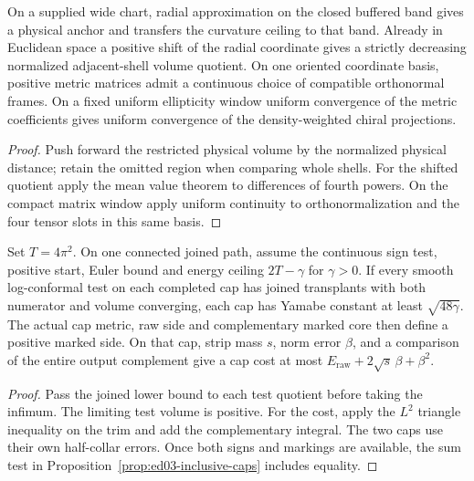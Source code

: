\begin{proposition}
\label{prop:ed03-chart-frame-tests}
\leanok
On a supplied wide chart, radial approximation on the closed buffered
band gives a physical anchor and transfers the curvature ceiling to
that band. Already in Euclidean space a positive shift of the radial
coordinate gives a strictly decreasing normalized adjacent-shell volume
quotient. On one oriented coordinate basis, positive metric matrices
admit a continuous choice of compatible orthonormal frames. On a fixed
uniform ellipticity window uniform convergence of the metric coefficients
gives uniform convergence of the density-weighted chiral projections.
\end{proposition}
\begin{proof}
\leanok
Push forward the restricted physical volume by the normalized physical
distance; retain the omitted region when comparing whole shells.
For the shifted quotient apply the mean value theorem to differences of
fourth powers. On the compact matrix window apply uniform continuity
to orthonormalization and the four tensor slots in this same basis.
\end{proof}

\begin{proposition}
\label{prop:ed03-cap-tests}
\leanok
Set $T=4\pi^2$. On one connected joined path, assume the continuous sign
test, positive start, Euler bound and energy ceiling $2T-\gamma$ for
$\gamma>0$. If every smooth log-conformal test on each completed cap
has joined transplants with both numerator and volume converging,
each cap has Yamabe constant at least $\sqrt{48\gamma}$. The actual
cap metric, raw side and complementary marked core then define a positive
marked side. On that cap, strip mass $s$, norm error $\beta$, and a comparison
of the entire output complement give a cap cost at most
$E_{\mathrm{raw}}+2\sqrt{s}\,\beta+\beta^2$.
\end{proposition}
\begin{proof}
\leanok
Pass the joined lower bound to each test quotient before taking the
infimum. The limiting test volume is positive. For the cost, apply the
$L^2$ triangle inequality on the trim and add the complementary integral.
The two caps use their own half-collar errors. Once both signs and markings
are available, the sum test in Proposition~\ref{prop:ed03-inclusive-caps}
includes equality.
\end{proof}

